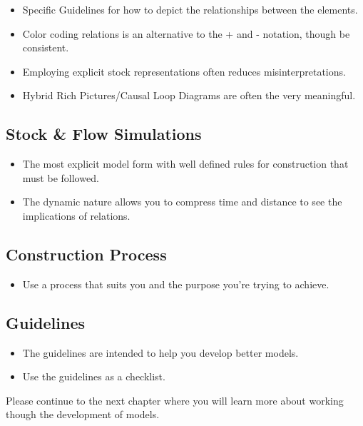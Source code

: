 \documentclass[]{memoir}
\begin{document}
\begin{itemize}
\itemsep1pt\parskip0pt
\item
  Specific Guidelines for how to depict the relationships between the
  elements.
\item
  Color coding relations is an alternative to the + and - notation,
  though be consistent.
\item
  Employing explicit stock representations often reduces
  misinterpretations.
\item
  Hybrid Rich Pictures/Causal Loop Diagrams are often the very
  meaningful.
\end{itemize}

\subsection{Stock \& Flow Simulations}

\begin{itemize}
\itemsep1pt\parskip0pt
\item
  The most explicit model form with well defined rules for construction
  that must be followed.
\item
  The dynamic nature allows you to compress time and distance to see the
  implications of relations.
\end{itemize}

\subsection{Construction Process}

\begin{itemize}
\itemsep1pt\parskip0pt
\item
  Use a process that suits you and the purpose you're trying to achieve.
\end{itemize}

\subsection{Guidelines}

\begin{itemize}
\itemsep1pt\parskip0pt
\item
  The guidelines are intended to help you develop better models.
\item
  Use the guidelines as a checklist.
\end{itemize}

Please continue to the next chapter where you will learn more about
working though the development of models.
\end{document}
